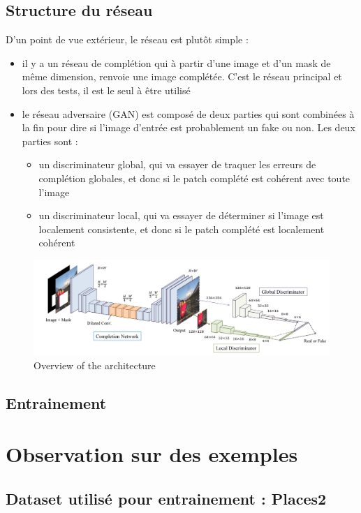 \documentclass[12pt]{article}
\begin{document}
\subsection{Structure du réseau}
D'un point de vue extérieur, le réseau est plutôt simple : 
\begin{itemize}
    \item il y a un réseau de complétion qui à partir d'une image et d'un mask de même dimension, renvoie une image complétée. C'est le réseau principal et lors des tests, il est le seul à être utilisé
    \item le réseau adversaire (GAN) est composé de deux parties qui sont combinées à la fin pour dire si l'image d'entrée est probablement un fake ou non. Les deux parties sont : 
    \begin{itemize}
        \item un discriminateur global, qui va essayer de traquer les erreurs de complétion globales, et donc si le patch complété est cohérent avec toute l'image
        \item un discriminateur local, qui va essayer de déterminer si l'image est localement consistente, et donc si le patch complété est localement cohérent
    \end{itemize}
\end{itemize}

\begin{figure}[H]
    \includegraphics[width=1.0\textwidth]{network_overview.png}
    \caption{Overview of the architecture}
\end{figure}

\subsection{Entrainement}

\section{Observation sur des exemples}

\subsection{Dataset utilisé pour entrainement : Places2}
\end{document}
